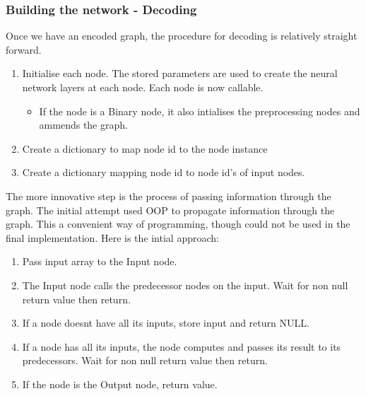 \subsubsection{Building the network - Decoding}

Once we have an encoded graph, the procedure for decoding is relatively straight forward.

\begin{enumerate}
    \item Initialise each node. The stored parameters are used to create the neural network layers at each node. Each node is now callable.
    \begin{itemize}
        \item If the node is a Binary node, it also intialises the preprocessing nodes and ammends the graph.
    \end{itemize}
    \item Create a dictionary to map node id to the node instance
    \item Create a dictionary mapping node id to node id's of input nodes.
\end{enumerate}

The more innovative step is the process of passing information through the graph. The initial attempt used OOP to propagate information through the graph. This a convenient way of programming, though could not be used in the final implementation. Here is the intial approach:
\begin{enumerate}
    \item Pass input array to the Input node.
    \item The Input node calls the predecessor nodes on the input. Wait for non null return value then return.
    \item If a node doesnt have all its inputs, store input and return NULL.
    \item If a node has all its inputs, the node computes and passes its result to its predecessors. Wait for non null return value then return.
    \item If the node is the Output node, return value.
\end{enumerate}


